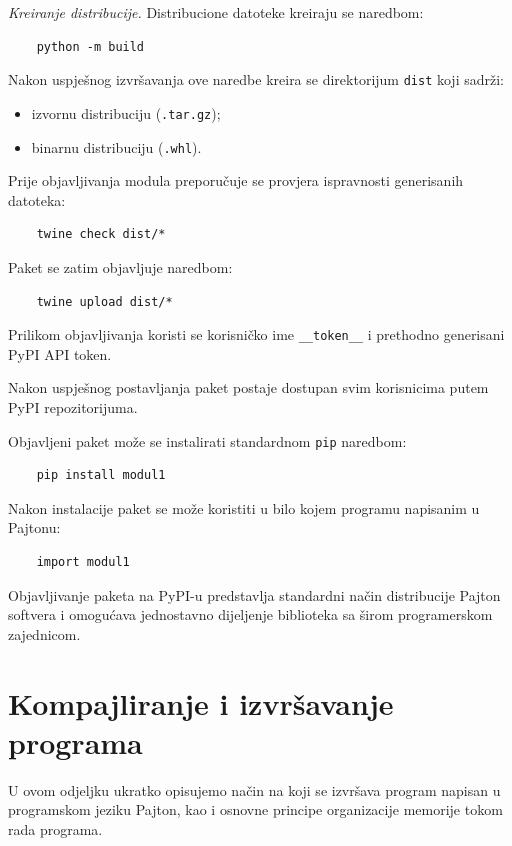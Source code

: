 \textit{Kreiranje distribucije.} Distribucione datoteke kreiraju se naredbom:

\begin{verbatim}
	python -m build
\end{verbatim}

Nakon uspješnog izvršavanja ove naredbe kreira se direktorijum \texttt{dist} koji sadrži:

\begin{itemize}
	\item izvornu distribuciju (\texttt{.tar.gz});
	\item binarnu distribuciju (\texttt{.whl}).
\end{itemize}


Prije objavljivanja modula preporučuje se provjera ispravnosti generisanih datoteka:

\begin{verbatim}
	twine check dist/*
\end{verbatim}

Paket se zatim objavljuje naredbom:

\begin{verbatim}
	twine upload dist/*
\end{verbatim}

Prilikom objavljivanja koristi se korisničko ime \texttt{\_\_token\_\_} i prethodno generisani PyPI API token.

Nakon uspješnog postavljanja paket postaje dostupan svim korisnicima putem PyPI repozitorijuma.


Objavljeni paket može se instalirati standardnom \texttt{pip} naredbom:

\begin{verbatim}
	pip install modul1
\end{verbatim}

Nakon instalacije paket se može koristiti u bilo kojem programu napisanim u Pajtonu:
\begin{verbatim}
	import modul1
\end{verbatim}

Objavljivanje paketa na PyPI-u predstavlja standardni način distribucije Pajton softvera i omogućava jednostavno dijeljenje biblioteka sa širom programerskom zajednicom.

\section{Kompajliranje i izvršavanje programa}

U ovom odjeljku ukratko opisujemo način na koji se izvršava program napisan u programskom jeziku Pajton, kao i osnovne principe organizacije memorije tokom rada programa.

